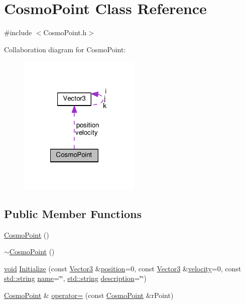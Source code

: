 \hypertarget{class_cosmo_point}{\section{Cosmo\+Point Class Reference}
\label{class_cosmo_point}
}


{\ttfamily \#include $<$Cosmo\+Point.\+h$>$}



Collaboration diagram for Cosmo\+Point\+:\nopagebreak
\begin{figure}[H]
\begin{center}
\leavevmode
\includegraphics[width=164pt]{class_cosmo_point__coll__graph}
\end{center}
\end{figure}
\subsection*{Public Member Functions}
\begin{DoxyCompactItemize}
\item 
\hyperlink{class_cosmo_point_a3ed8019debc8234f8a2d89227ecef8cf}{Cosmo\+Point} ()
\item 
\hyperlink{class_cosmo_point_afc5c4495696cb761c688510b396f4700}{$\sim$\+Cosmo\+Point} ()
\item 
\hyperlink{wglext_8h_a9e6b7f1933461ef318bb000d6bd13b83}{void} \hyperlink{class_cosmo_point_a1543df6d5876e97a1b01fd6458ad4022}{Initialize} (const \hyperlink{class_vector3}{Vector3} \&\hyperlink{class_cosmo_point_a3927ca95564570083312401e1f10aaaa}{position}=0, const \hyperlink{class_vector3}{Vector3} \&\hyperlink{class_cosmo_point_a902bd391f682c0d60924bb43758e49f5}{velocity}=0, const \hyperlink{glext_8h_ae84541b4f3d8e1ea24ec0f466a8c568b}{std\+::string} \hyperlink{glext_8h_ad977737dfc9a274a62741b9500c49a32}{name}=\char`\"{}\char`\"{}, \hyperlink{glext_8h_ae84541b4f3d8e1ea24ec0f466a8c568b}{std\+::string} \hyperlink{class_cosmo_point_ab20d9a18d306ee9e268cc248493d50c3}{description}=\char`\"{}\char`\"{})
\item 
\hyperlink{class_cosmo_point}{Cosmo\+Point} \& \hyperlink{class_cosmo_point_ab838e5d61a68cebbec67ce06f9030c57}{operator=} (const \hyperlink{class_cosmo_point}{Cosmo\+Point} \&r\+Point)
\end{DoxyCompactItemize}
